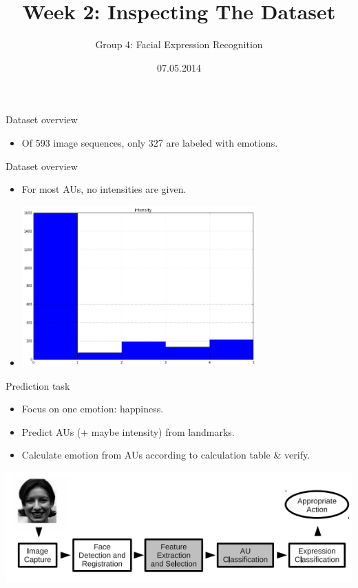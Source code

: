 \documentclass[xcolor=dvipsnames]{beamer}
\title{Week 2: Inspecting The Dataset}
\author{Group 4: Facial Expression Recognition}
\date{07.05.2014}
\begin{document}
\maketitle{}

\begin{frame}{Dataset overview}
  \begin{itemize}
    \item Of 593 image sequences, only 327 are labeled with emotions.
  \end{itemize}
\end{frame}

\begin{frame}{Dataset overview}
  \begin{itemize}
    \item For most AUs, no intensities are given.
    \item[] \includegraphics[width=9cm]{au_intensity_histogram}
  \end{itemize}
\end{frame}

\begin{frame}{Prediction task}
  \begin{itemize}
    \item Focus on one emotion: happiness.
    \item Predict AUs (+ maybe intensity) from landmarks.
    \item Calculate emotion from AUs according to calculation table \& verify.
  \end{itemize}
  \centering
  \includegraphics[width=\textwidth]{prediction_process}
\end{frame}
\end{document}
